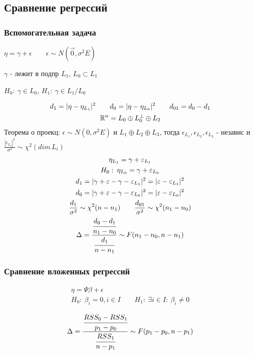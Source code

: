 \documentclass{article}
\begin{document}
\subsection{Сравнение регрессий}
\subsubsection{Вспомогательная задача}

$\eta = \gamma + \epsilon \qquad \epsilon \sim N(\vec{0}, \sigma^{2}E)$

$\gamma$ - лежит в подпр $L_1$, $L_0 \subset L_1$

$H_0: \: \gamma \in L_0$, $H_1: \: \gamma \in L_1/L_0$

\begin{gather*}
  d_1=|\eta-\eta_{L_1}|^{2} \qquad d_0=|\eta-\eta_{L_0}|^{2} \qquad d_{01}=d_0 -d_1 \\ 
  \R^{n}=L_0 \oplus L_0^{\perp} \oplus L_2
\end{gather*}
Теорема о проекц: $\epsilon \sim N(0, \sigma^{2} E)$ и $L_1 \oplus L_2 \oplus L_3$,
тогда $\epsilon_{L_1},\epsilon_{L_2},\epsilon_{L_3}$ - независ и $\frac{|\epsilon_{L_i}|^{2}}{\sigma^{2}} \sim \chi^{2}(dim \, L_i)$
\begin{gather*}
  \eta_{L_1}=\gamma + \epsilon_{L_1} \\ 
  H_0: \: \eta_{L_0}=\gamma + \epsilon_{L_0} \\ 
  d_1 = |\gamma + \epsilon - \gamma - \epsilon_{L_1}|^{2}= |\epsilon - \epsilon_{L_1}|^{2} \\ 
  d_0 = |\gamma + \epsilon - \gamma - \epsilon_{L_0}|^{2} = |\epsilon - \epsilon_{L_0}|^{2} \\ 
  \frac{d_1}{\sigma^{2}} \sim \chi^{2}(n-n_1) \qquad \frac{d_{01}}{\sigma^{2}} \sim \chi^{2}(n_1-n_0) \\ 
  \Delta = \frac{\cfrac{d_0-d_1}{n_1-n_0}}{\cfrac{d_1}{n-n_1}} \sim F(n_1 - n_0, n - n_1)
\end{gather*}

\subsubsection{Сравнение вложенных регрессий}
\begin{gather*}
  \eta = \Psi \beta + \epsilon \\ 
  H_0: \: \beta_i = 0, i\in I \qquad H_1: \: \exists i\in I: \: \beta_i\neq 0
\end{gather*}

\[
  \Delta = \frac{\cfrac{RSS_0-RSS_1}{p_1-p_0}}{\cfrac{RSS_1}{n-p_1}} \sim F(p_1-p_0,n-p_1)
\]
\end{document}
